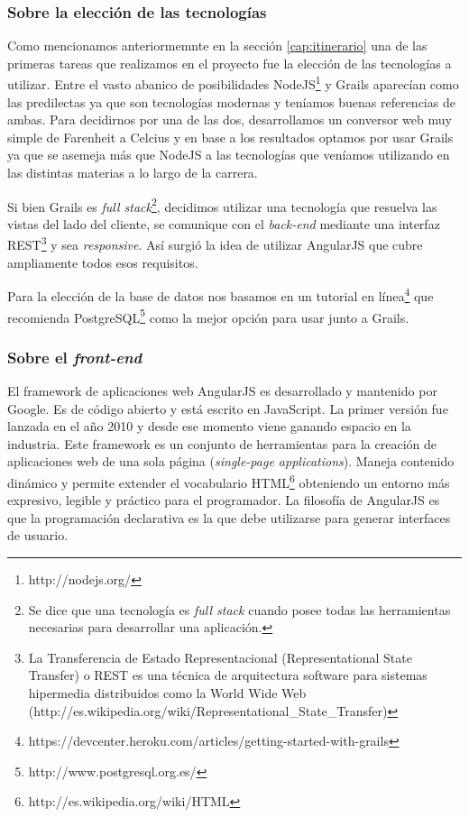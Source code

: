 \subsubsection{Sobre la elección de las tecnologías}\label{cap:eleccion_tecnologias}
Como mencionamos anteriormemnte en la sección \ref{cap:itinerario} una de las primeras tareas que realizamos en el proyecto fue la elección de las tecnologías a utilizar. Entre el vasto abanico de posibilidades NodeJS\footnote{http://nodejs.org/} y Grails aparecían como las predilectas ya que son tecnologías modernas y teníamos buenas referencias de ambas. Para decidirnos por una de las dos, desarrollamos un conversor web muy simple de Farenheit a Celcius y en base a los resultados optamos por usar Grails ya que se asemeja más que NodeJS a las tecnologías que veníamos utilizando en las distintas materias a lo largo de la carrera.

Si bien Grails es \textit{full stack}\footnote{Se dice que una tecnología es \textit{full stack} cuando posee todas las herramientas necesarias para desarrollar una aplicación.}, decidimos utilizar una tecnología que resuelva las vistas del lado del cliente, se comunique con el \textit{back-end} mediante una interfaz REST\footnote{La Transferencia de Estado Representacional (Representational State Transfer) o REST es una técnica de arquitectura software para sistemas hipermedia distribuidos como la World Wide Web (http://es.wikipedia.org/wiki/Representational\_State\_Transfer)} 
y sea \textit{responsive}. Así surgió la idea de utilizar AngularJS que cubre ampliamente todos esos requisitos.

Para la elección de la base de datos nos basamos en un tutorial en línea\footnote{https://devcenter.heroku.com/articles/getting-started-with-grails} que recomienda PostgreSQL\footnote{http://www.postgresql.org.es/} como la mejor opción para usar junto a Grails.

\subsubsection{Sobre el \textit{front-end}}
El framework de aplicaciones web AngularJS es desarrollado y mantenido por Google. Es de código abierto y está escrito en JavaScript. La primer versión fue lanzada en el año 2010 y desde ese momento viene ganando espacio en la industria. Este framework es un conjunto de herramientas para la creación de aplicaciones web de una sola página (\textit{single-page applications}). Maneja contenido dinámico y permite extender el vocabulario HTML\footnote{http://es.wikipedia.org/wiki/HTML} obteniendo un entorno más expresivo, legible y práctico para el programador. La filosofía de AngularJS es que la programación declarativa es la que debe utilizarse para generar interfaces de usuario.

